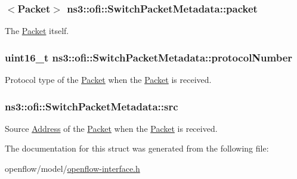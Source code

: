 \subsubsection[{\texorpdfstring{packet}{packet}}]{$<${\bf Packet}$>$ ns3\+::ofi\+::\+Switch\+Packet\+Metadata\+::packet}\hypertarget{structns3_1_1ofi_1_1SwitchPacketMetadata_af65b736eec9acce5f07f3913e2aa1e5d}{}\label{structns3_1_1ofi_1_1SwitchPacketMetadata_af65b736eec9acce5f07f3913e2aa1e5d}


The \hyperlink{classns3_1_1Packet}{Packet} itself. 

\subsubsection[{\texorpdfstring{protocol\+Number}{protocolNumber}}]{\setlength{\rightskip}{0pt plus 5cm}uint16\+\_\+t ns3\+::ofi\+::\+Switch\+Packet\+Metadata\+::protocol\+Number}\hypertarget{structns3_1_1ofi_1_1SwitchPacketMetadata_ab30a123047b6798f0658fd5f26995786}{}\label{structns3_1_1ofi_1_1SwitchPacketMetadata_ab30a123047b6798f0658fd5f26995786}


Protocol type of the \hyperlink{classns3_1_1Packet}{Packet} when the \hyperlink{classns3_1_1Packet}{Packet} is received. 

\subsubsection[{\texorpdfstring{src}{src}}]{ ns3\+::ofi\+::\+Switch\+Packet\+Metadata\+::src}\hypertarget{structns3_1_1ofi_1_1SwitchPacketMetadata_aa9a18c3d3ed379a6caba3b389149e61f}{}\label{structns3_1_1ofi_1_1SwitchPacketMetadata_aa9a18c3d3ed379a6caba3b389149e61f}


Source \hyperlink{classns3_1_1Address}{Address} of the \hyperlink{classns3_1_1Packet}{Packet} when the \hyperlink{classns3_1_1Packet}{Packet} is received. 



The documentation for this struct was generated from the following file\+:\begin{DoxyCompactItemize}
\item 
openflow/model/\hyperlink{openflow-interface_8h}{openflow-\/interface.\+h}\end{DoxyCompactItemize}
